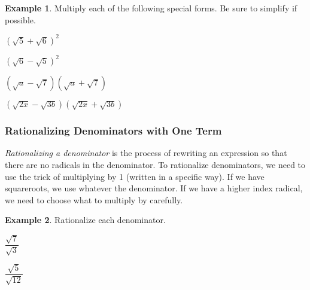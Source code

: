 \documentclass[addpoints,12pt]{exam}
\theoremstyle{definition}
\newtheorem{example}{Example}[subsection]
\begin{document}
\newpage

\begin{example}
Multiply each of the following special forms. Be sure to simplify if possible.
\begin{enumerate}
\begin{minipage}{.5\textwidth}
\item $\left(\sqrt{5}+\sqrt{6}\right)^2$
\vspace{1.5in}
\item $\left(\sqrt{6}-\sqrt{5}\right)^2$
\vspace{1.5in}
\end{minipage}%
\begin{minipage}{.5\textwidth}
\item $\left(\sqrt{a}-\sqrt{7}\right)\left(\sqrt{a}+\sqrt{7}\right)$
\vspace{1.5in}
\item $\left(\sqrt{2x}-\sqrt{3b}\right)\left(\sqrt{2x}+\sqrt{3b}\right)$
\vspace{1.5in}
\end{minipage}%
\end{enumerate}
\end{example}




\subsubsection*{Rationalizing Denominators with One Term}

\emph{Rationalizing a denominator} is the process of rewriting an expression so that there are no radicals in the denominator. To rationalize denominators, we need to use the trick of multiplying by 1 (written in a specific way). If we have squareroots, we use whatever the denominator. If we have a higher index radical, we need to choose what to multiply by carefully.

\vspace{.25in}

\begin{example}
Rationalize each denominator.
\begin{enumerate}
\begin{minipage}{.5\textwidth}
\item $\dfrac{\sqrt{7}}{\sqrt{3}}$
\end{minipage}%
\begin{minipage}{.5\textwidth}
\item $\dfrac{\sqrt{5}}{\sqrt{12}}$
\end{minipage}%
\end{enumerate}
\end{example}
\end{document}
